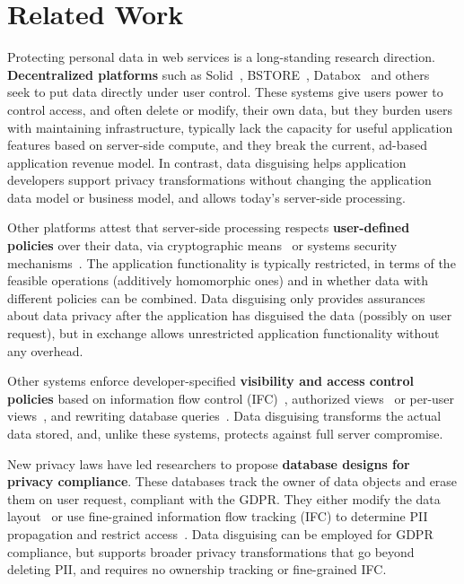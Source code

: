 \section{Related Work}
\label{sec:related}

%
Protecting personal data in web services is a long-standing research direction.
%
\textbf{Decentralized platforms} such as Solid~\cite{solid}, BSTORE~\cite{bstore},
Databox~\cite{databox} and others~\cite{diy, amber, oort, w5, blockstack}
seek to put data directly under user control.
%
These systems give users power to control access, and often delete or modify, their
own data, but they burden users with maintaining infrastructure, typically lack the
capacity for useful application features based on server-side compute, and they break
the current, ad-based application revenue model.
%
In contrast, data disguising helps application developers support privacy
transformations without changing the application data model or business model,
and allows today's server-side processing.
%

%
Other platforms attest that server-side processing respects
\textbf{user-defined policies} over their data, via cryptographic means~\cite{zeph}
or systems security mechanisms~\cite{riverbed}.
%
The application functionality is typically restricted, in terms of the feasible
operations (\eg additively homomorphic ones) and in whether data with different policies
can be combined.
%
Data disguising only provides assurances about data privacy after the application has
disguised the data (possibly on user request), but in exchange allows unrestricted
application functionality without any overhead.
%

%
Other systems enforce developer-specified \textbf{visibility and access control policies}
based on information flow control (IFC)~\cite{static, jeeves, jif, hails, ifdb},
authorized views~\cite{oracle} or per-user views~\cite{multiverse}, and rewriting database
queries~\cite{qapla, sieve}.
%
Data disguising transforms the actual data stored, and, unlike these systems, protects
against full server compromise.
%


%
New privacy laws have led researchers to propose \textbf{database designs
for privacy compliance}.
%
These databases track the owner of data objects and erase them on user request, compliant
with \eg the GDPR.
%
They either modify the data layout~\cite{usershards} or use fine-grained information flow
tracking (IFC) to determine PII propagation and restrict access~\cite{schengendb}.
%
Data disguising can be employed for GDPR compliance, but supports broader privacy
transformations that go beyond deleting PII, and requires no ownership tracking or
fine-grained IFC.
%

